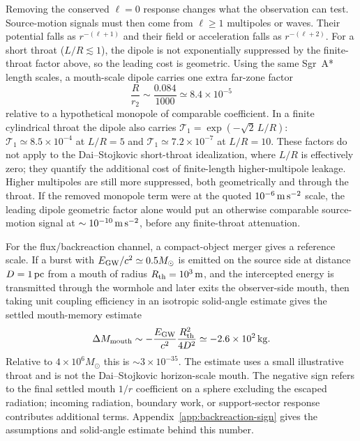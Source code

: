\documentclass[aps,prd,10pt,onecolumn,nofootinbib,superscriptaddress,floatfix]{revtex4-2}
\begin{document}
Removing the conserved $\ell=0$ response changes what the observation can test.
Source-motion signals must then come from $\ell\ge1$ multipoles or waves.
Their potential falls as
$r^{-(\ell+1)}$ and their field or acceleration falls as $r^{-(\ell+2)}$.  For
a short throat ($L/R\lesssim1$), the dipole is not exponentially suppressed by
the finite-throat factor above, so the leading cost is geometric.  Using the
same Sgr~A* length scales, a mouth-scale dipole carries one extra far-zone
factor
\begin{equation}
  \frac{R}{r_2}\sim \frac{0.084}{1000}\simeq 8.4\times10^{-5}
\end{equation}
relative to a hypothetical monopole of comparable coefficient.  In a finite
cylindrical throat the dipole also carries
$\mathcal T_1=\exp(-\sqrt2\,L/R)$: $\mathcal T_1\simeq8.5\times10^{-4}$ at
$L/R=5$ and $\mathcal T_1\simeq7.2\times10^{-7}$ at $L/R=10$.  These factors do
not apply to the Dai--Stojkovic short-throat idealization, where $L/R$ is
effectively zero; they quantify the additional cost of finite-length
higher-multipole leakage.  Higher multipoles are still more suppressed, both
geometrically and through the throat.  If the removed monopole term were at
the quoted $10^{-6}\,{\rm m\,s^{-2}}$ scale, the leading dipole geometric
factor alone would put an otherwise comparable source-motion signal at
$\sim10^{-10}\,{\rm m\,s^{-2}}$, before any finite-throat attenuation.

For the flux/backreaction channel, a compact-object merger gives a reference
scale.  If a burst with $E_{\rm GW}/c^2\simeq0.5M_\odot$ is emitted on the
source side at distance $D=1\,{\rm pc}$ from a mouth of radius
$R_{\rm th}=10^3\,{\rm m}$, and the intercepted energy is transmitted through
the wormhole and later exits the observer-side mouth, then taking unit coupling
efficiency in an isotropic solid-angle estimate gives the settled mouth-memory
estimate
\begin{equation}
  \Delta M_{\rm mouth}
  \sim
  -\frac{E_{\rm GW}}{c^2}\frac{R_{\rm th}^2}{4D^2}
  \simeq -2.6\times10^2\,{\rm kg}.
\end{equation}
Relative to $4\times10^6M_\odot$ this is $\sim3\times10^{-35}$.  The estimate
uses a small illustrative throat and is not the Dai--Stojkovic horizon-scale
mouth.  The negative sign refers to the final settled mouth $1/r$ coefficient
on a sphere excluding the escaped radiation; incoming radiation, boundary work,
or support-sector response contributes additional terms.
Appendix~\ref{app:backreaction-sign} gives the assumptions and solid-angle estimate
behind this number.
\end{document}
